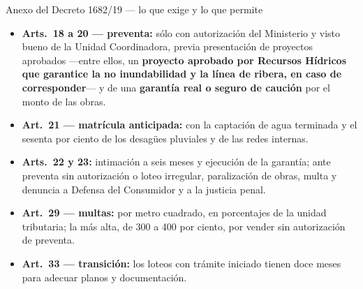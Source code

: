 \begin{ficha}{Anexo del Decreto 1682/19 --- lo que exige y lo que permite}
\begin{itemize}[leftmargin=*,nosep]
\item \textbf{Arts.\ 18 a 20 --- preventa:} sólo con autorización del Ministerio y visto bueno de la Unidad Coordinadora, previa presentación de proyectos aprobados ---entre ellos, un \textbf{proyecto aprobado por Recursos Hídricos que garantice la no inundabilidad y la línea de ribera, en caso de corresponder}--- y de una \textbf{garantía real o seguro de caución} por el monto de las obras.
\item \textbf{Art.\ 21 --- matrícula anticipada:} con la captación de agua terminada y el sesenta por ciento de los desagües pluviales y de las redes internas.
\item \textbf{Arts.\ 22 y 23:} intimación a seis meses y ejecución de la garantía; ante preventa sin autorización o loteo irregular, paralización de obras, multa y denuncia a Defensa del Consumidor y a la justicia penal.
\item \textbf{Art.\ 29 --- multas:} por metro cuadrado, en porcentajes de la unidad tributaria; la más alta, de 300 a 400 por ciento, por vender sin autorización de preventa.
\item \textbf{Art.\ 33 --- transición:} los loteos con trámite iniciado tienen doce meses para adecuar planos y documentación.
\end{itemize}
\end{ficha}

